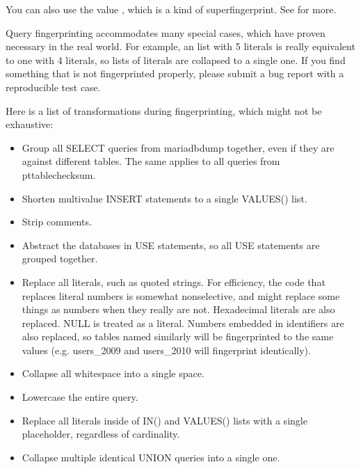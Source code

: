 \documentclass[letterpaper,10pt,english]{sphinxmanual}
\begin{document}
You can also use the value , which is a kind of super\sphinxhyphen{}fingerprint.
See {\hyperref[\detokenize{mariadb-query-digest:cmdoption-mariadb-query-digest-group-by}]{}} for more.

Query fingerprinting accommodates many special cases, which have proven
necessary in the real world.  For example, an  list with 5 literals
is really equivalent to one with 4 literals, so lists of literals are
collapsed to a single one.  If you find something that is not fingerprinted
properly, please submit a bug report with a reproducible test case.

Here is a list of transformations during fingerprinting, which might not
be exhaustive:
\begin{itemize}
\item {} 
Group all SELECT queries from mariadb\sphinxhyphen{}dump together, even if they are against
different tables.  The same applies to all queries from pt\sphinxhyphen{}table\sphinxhyphen{}checksum.

\item {} 
Shorten multi\sphinxhyphen{}value INSERT statements to a single VALUES() list.

\item {} 
Strip comments.

\item {} 
Abstract the databases in USE statements, so all USE statements are grouped
together.

\item {} 
Replace all literals, such as quoted strings.  For efficiency, the code that
replaces literal numbers is somewhat non\sphinxhyphen{}selective, and might replace some
things as numbers when they really are not.  Hexadecimal literals are also
replaced.  NULL is treated as a literal.  Numbers embedded in identifiers are
also replaced, so tables named similarly will be fingerprinted to the same
values (e.g. users\_2009 and users\_2010 will fingerprint identically).

\item {} 
Collapse all whitespace into a single space.

\item {} 
Lowercase the entire query.

\item {} 
Replace all literals inside of IN() and VALUES() lists with a single
placeholder, regardless of cardinality.

\item {} 
Collapse multiple identical UNION queries into a single one.

\end{itemize}
\end{document}
